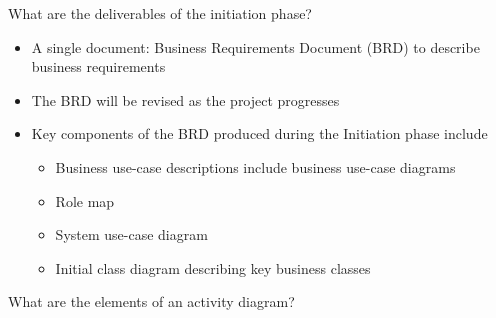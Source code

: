 \documentclass[10pt,a4paper]{exam}
\begin{document}
\begin{questions}
\question What are the deliverables of the initiation phase?
\begin{solution}
\begin{itemize}

        \item A single document: Business Requirements Document (BRD) to describe business requirements
        \item The BRD will be revised as the project progresses
        \item Key components of the BRD produced during the Initiation phase include

        \begin{itemize}
        \item Business use-case descriptions include business use-case diagrams
        \item Role map
        \item System use-case diagram
        \item Initial class diagram describing key business classes
        \end{itemize}

\end{itemize}
\end{solution}


\question What are the elements of an activity diagram?
\begin{solution}
\begin{itemize}


\end{itemize}
\end{solution}
\end{questions}
\end{document}
